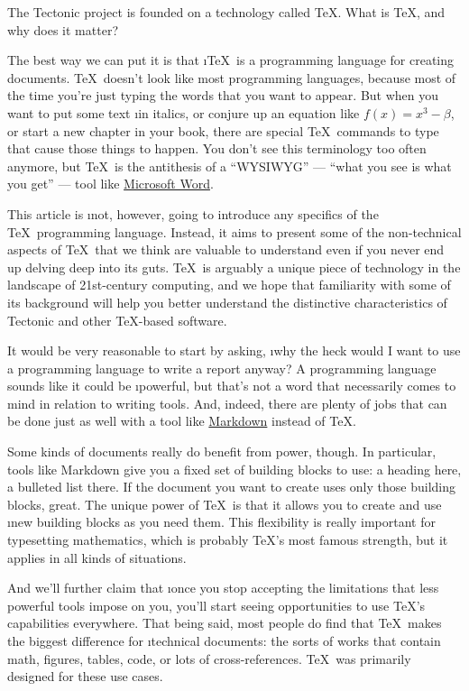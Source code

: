 
The Tectonic project is founded on a technology called \TeX. What is \TeX, and
why does it matter?

The best way we can put it is that \i{\TeX\ is a programming language for
creating documents}. \TeX\ doesn't look like most programming languages, because
most of the time you're just typing the words that you want to appear. But when
you want to put some text \i{in italics}, or conjure up an equation like $f(x) =
x^3 - \beta$, or start a new chapter in your book, there are special \TeX\
commands to type that cause those things to happen. You don’t see this
terminology too often anymore, but \TeX\ is the antithesis of a “WYSIWYG” —
“what you see is what you get” — tool like
\href{https://www.microsoft.com/en-us/microsoft-365/word}{Microsoft Word}.

This article is \i{not}, however, going to introduce any specifics of the \TeX\
programming language. Instead, it aims to present some of the non-technical aspects
of \TeX\ that we think are valuable to understand even if you never end up
delving deep into its guts. \TeX\ is arguably a unique piece of technology in
the landscape of 21st-century computing, and we hope that familiarity with some
of its background will help you better understand the distinctive
characteristics of Tectonic and other \TeX-based software.

It would be very reasonable to start by asking, \i{why the heck would I want to
use a programming language to write a report anyway?} A programming language
sounds like it could be \i{powerful}, but that's not a word that necessarily
comes to mind in relation to writing tools. And, indeed, there are plenty of
jobs that can be done just as well with a tool like
\href{https://en.wikipedia.org/wiki/Markdown}{Markdown} instead of \TeX.

Some kinds of documents really do benefit from power, though. In particular,
tools like Markdown give you a fixed set of building blocks to use: a heading
here, a bulleted list there. If the document you want to create uses only those
building blocks, great. The unique power of \TeX\ is that it allows you to
create and use \i{new} building blocks as you need them. This flexibility is
really important for typesetting mathematics, which is probably \TeX's most
famous strength, but it applies in all kinds of situations.

And we'll further claim that \i{once you stop accepting the limitations that
less powerful tools impose on you, you'll start seeing opportunities to use
\TeX's capabilities everywhere}. That being said, most people do find that \TeX\
makes the biggest difference for \i{technical documents}: the sorts of works
that contain math, figures, tables, code, or lots of cross-references. \TeX\ was
primarily designed for these use cases.

